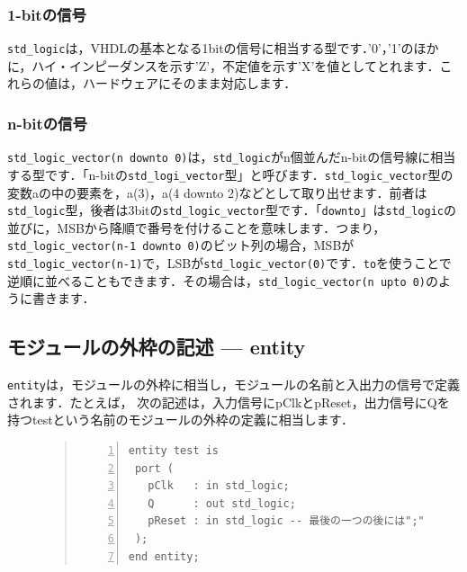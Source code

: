 \documentclass[a4paper,dvipdfmx]{jsarticle}
\begin{document}
\subsubsection{1-bitの信号}
\verb|std_logic|は，VHDLの基本となる1bitの信号に相当する型です．'0'，'1'のほかに，ハイ・インピーダンスを示す'Z'，不定値を示す'X'を値としてとれます．これらの値は，ハードウェアにそのまま対応します．

\subsubsection{n-bitの信号}
\verb|std_logic_vector(n downto 0)|は，\verb|std_logic|がn個並んだn-bitの信号線に相当する型です．「n-bitの\verb|std_logi_vector|型」と呼びます．\verb|std_logic_vector|型の変数aの中の要素を，a(3)，a(4 downto 2)などとして取り出せます．前者は\verb|std_logic|型，後者は3bitの\verb|std_logic_vector|型です．「\verb|downto|」は\verb|std_logic|の並びに，MSBから降順で番号を付けることを意味します．つまり，\verb|std_logic_vector(n-1 downto 0)|のビット列の場合，MSBが\verb|std_logic_vector(n-1)|で，LSBが\verb|std_logic_vector(0)|です．\verb|to|を使うことで逆順に並べることもできます．その場合は，\verb|std_logic_vector(n upto 0)|のように書きます．

\subsection{モジュールの外枠の記述 --- entity}
\verb|entity|は，モジュールの外枠に相当し，モジュールの名前と入出力の信号で定義されます．たとえば，
次の記述は，入力信号にpClkとpReset，出力信号にQを持つtestという名前のモジュールの外枠の定義に相当します．

\begin{figure}[H]
\begin{quote}
\begin{Verbatim}[frame=single, numbers=left, baselinestretch=0.8]
entity test is
 port (
   pClk   : in std_logic;
   Q      : out std_logic;
   pReset : in std_logic -- 最後の一つの後には";"をつけない
 );
end entity;
\end{Verbatim}
\end{quote}
\end{figure}
\end{document}

